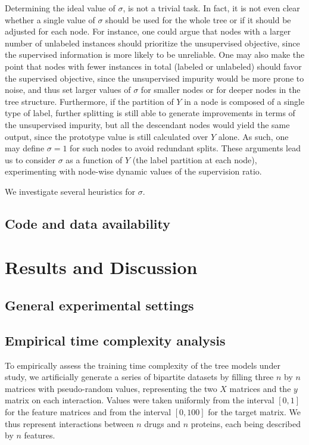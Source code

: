Determining the ideal value of $\sigma$, is not a trivial task. In fact, it is not even clear whether a single value of $\sigma$ should be used for the whole tree or if it should be adjusted for each node. For instance, one could argue that nodes with a larger number of unlabeled instances should prioritize the unsupervised objective, since the supervised information is more likely to be unreliable.
One may also make the point that nodes with fewer instances in total (labeled or unlabeled) should favor the supervised objective, since the unsupervised impurity would be more prone to noise, and thus set larger values of $\sigma$ for smaller nodes or for deeper nodes in the tree structure.
Furthermore, if the partition of $Y$ in a node is composed of a single type of label, further splitting is still able to generate improvements in terms of the unsupervised impurity, but all the descendant nodes would yield the same output, since the prototype value is still calculated over $Y$ alone. As such, one may define $\sigma=1$ for such nodes to avoid redundant splits. These arguments lead us to consider $\sigma$ as a function of $Y$ (the label partition at each node), experimenting with node-wise dynamic values of the supervision ratio.

We investigate several heuristics for $\sigma$.



\subsection{Code and data availability}

\section{Results and Discussion}

\subsection{General experimental settings}


\subsection{Empirical time complexity analysis}
\label{sec:empirical_complexity}

To empirically assess the training time complexity of the tree models under study, we artificially generate a series of bipartite datasets by filling three $n$ by $n$ matrices with pseudo-random values, representing the two $X$ matrices and the $y$ matrix on each interaction. Values were taken uniformly from the interval $[0, 1]$ for the feature matrices and from the interval $[0, 100]$ for the target matrix. We thus represent interactions between $n$ drugs and $n$ proteins, each being described by $n$ features.

